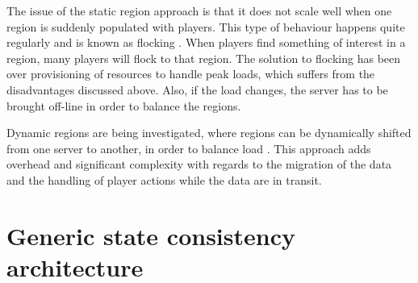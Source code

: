 The issue of the static region approach is that it does not scale well when one region is suddenly populated with players. This type of behaviour
happens quite regularly and is known as flocking \cite{flocking}. When players find something of interest in a region, many players will flock to
that region. The solution to flocking has been over provisioning of resources to handle peak loads, which suffers from the disadvantages discussed
above. Also, if the load changes, the server has to be brought off-line in order to balance the regions.

Dynamic regions are being investigated, where regions can be dynamically shifted from one server to another, in order to balance load
\cite{zone_based_dyn}. This approach adds overhead and significant complexity with regards to the migration of the data and the handling of player
actions while the data are in transit.

\section{Generic state consistency architecture}
